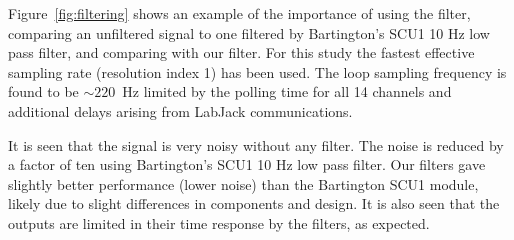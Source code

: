 
Figure~\ref{fig:filtering} shows an example of the importance of using
the filter, comparing an unfiltered signal to one filtered by
Bartington's SCU1 10 Hz low pass filter, and comparing with our
filter.  For this study the fastest effective sampling rate
(resolution index 1) has been used.  The loop sampling frequency is
found to be $\sim 220$~Hz limited by the polling time for all 14
channels and additional delays arising from LabJack communications.

It is seen that the signal is very noisy without any filter. The noise
is reduced by a factor of ten using Bartington's SCU1 10 Hz low pass
filter.  Our filters gave slightly better performance (lower noise)
than the Bartington SCU1 module, likely due to slight differences in
components and design.  It is also seen that the outputs are limited
in their time response by the filters, as expected.


